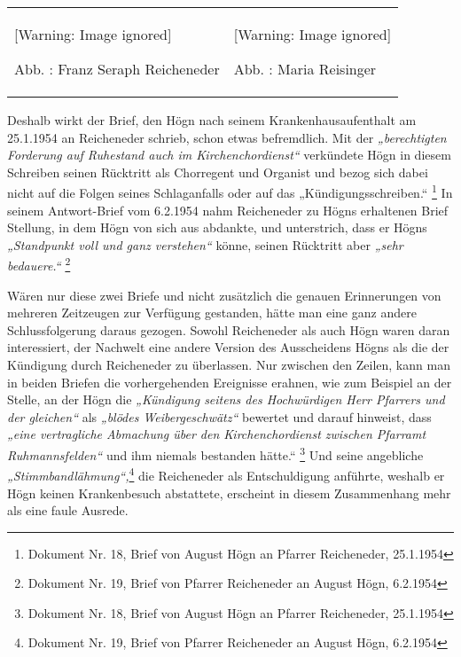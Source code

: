 \documentclass[a4paper]{article}
\newcommand\textstyleZitate[1]{\textit{#1}}
\newcounter{Abb}
\renewcommand\theAbb{\arabic{Abb}}
\begin{document}
\begin{center}
\begin{minipage}{10.084cm}
\begin{flushleft}
\tablefirsthead{}
\tablehead{}
\tabletail{}
\tablelasttail{}
\begin{supertabular}{m{5.018cm}m{4.6670003cm}}
  [Warning: Image ignored] %
 
Abb. \stepcounter{Abb}{\theAbb}: Franz Seraph Reicheneder &
  [Warning: Image ignored] %
 
Abb. \stepcounter{Abb}{\theAbb}: Maria Reisinger\\
\end{supertabular}
\end{flushleft}
\end{minipage}
\end{center}
Deshalb wirkt der Brief, den Högn nach seinem Krankenhausaufenthalt am
25.1.1954 an Reicheneder schrieb, schon etwas befremdlich. Mit der
\textstyleZitate{„berechtigten Forderung auf Ruhestand auch im
Kirchenchordienst“} verkündete Högn in diesem Schreiben seinen
Rücktritt als Chorregent und Organist und bezog sich dabei nicht auf
die Folgen seines Schlaganfalls oder auf das „Kündigungsschreiben.“
\footnote{ Dokument Nr. 18, Brief von August Högn an Pfarrer
Reicheneder, 25.1.1954} In seinem Antwort-Brief vom 6.2.1954 nahm
Reicheneder zu Högns erhaltenen Brief Stellung, in dem Högn von sich
aus abdankte, und unterstrich, dass er Högns
\textstyleZitate{„Standpunkt voll und ganz verstehen“} könne, seinen
Rücktritt aber \textstyleZitate{„sehr bedauere.“ }\footnote{ Dokument
Nr. 19, Brief von Pfarrer Reicheneder an August Högn, 6.2.1954}

Wären nur diese zwei Briefe und nicht zusätzlich die genauen
Erinnerungen von mehreren Zeitzeugen zur Verfügung gestanden, hätte man
eine ganz andere Schlussfolgerung daraus gezogen. Sowohl Reicheneder
als auch Högn waren daran interessiert, der Nachwelt eine andere
Version des Ausscheidens Högns als die der Kündigung durch Reicheneder
zu überlassen. Nur zwischen den Zeilen, kann man in beiden Briefen die
vorhergehenden Ereignisse erahnen, wie zum Beispiel an der Stelle, an
der Högn die \textstyleZitate{„Kündigung seitens des Hochwürdigen Herr
Pfarrers und der gleichen“} als \textstyleZitate{„blödes
Weibergeschwätz“} bewertet und darauf hinweist, dass
\textstyleZitate{„eine vertragliche Abmachung über den
Kirchenchordienst zwischen Pfarramt Ruhmannsfelden“ }und ihm niemals
bestanden hätte.“ \footnote{ Dokument Nr. 18, Brief von August Högn an
Pfarrer Reicheneder, 25.1.1954}\textstyleZitate{ }Und seine angebliche
\textstyleZitate{„Stimmbandlähmung“,}\footnote{ Dokument Nr. 19, Brief
von Pfarrer Reicheneder an August Högn, 6.2.1954}\textstyleZitate{ }die
Reicheneder als Entschuldigung anführte, weshalb er Högn keinen
Krankenbesuch abstattete, erscheint in diesem Zusammenhang mehr als
eine faule Ausrede.
\end{document}
